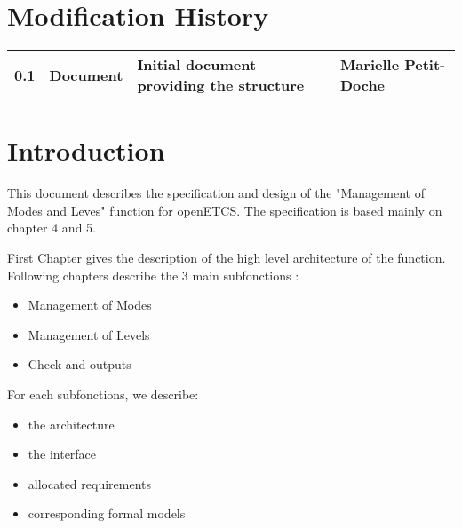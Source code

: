 \documentclass{template/openetcs_report}
\begin{document}


\chapter*{Modification History}
\begin{supertabular}{| m{1.2cm} | m{1.5cm} | m{6.6cm} | m{3.7cm} |}
0.1 & Document & Initial document providing the structure & Marielle Petit-Doche \\\hline

\end{supertabular}

\setcounter{tocdepth}{3}


\tableofcontents
\listoffiguresandtables
\newpage




\mainmatter

\chapter{Introduction}


This document describes the specification and design of the "Management of Modes and Leves" function for openETCS. The specification is based mainly on \citep{subset-026} chapter 4 and 5.

First Chapter gives the description of the high level architecture of the function.
Following chapters describe the 3 main subfonctions :
\begin{itemize}
\item Management of Modes
\item Management of Levels
\item Check and outputs
\end{itemize}

For each subfonctions, we describe: 
\begin{itemize}
\item the architecture
\item the interface
\item allocated requirements
\item corresponding formal models
\end{itemize}
\end{document}
